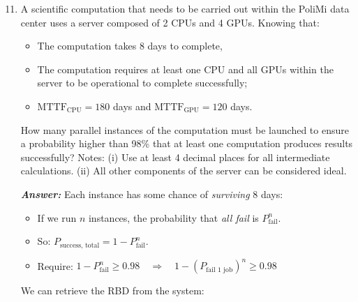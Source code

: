 \begin{enumerate}
    \setcounter{enumi}{10}

    \item A scientific computation that needs to be carried out within the PoliMi data center uses a server composed of 2 CPUs and 4 GPUs. Knowing that:
    \begin{itemize}
        \item The computation takes 8 days to complete,
        \item The computation requires at least one CPU and all GPUs within the server to be operational to complete successfully;
        \item $\text{MTTF}_{\text{CPU}} = 180$ days and $\text{MTTF}_\text{GPU} = 120$ days.
    \end{itemize}
    How many parallel instances of the computation must be launched to ensure a probability higher than 98\% that at least one computation produces results successfully? Notes: (i) Use at least 4 decimal places for all intermediate calculations. (ii) All other components of the server can be considered ideal.

    \emph{\textcolor{Green3}{\textbf{Answer:}}} Each instance has some chance of \emph{surviving} 8 days:
    \begin{itemize}
        \item If we run $n$ instances, the probability that \emph{all fail} is $P_{\text{fail}}^n$.
        \item So: $P_{\text{success, total}} = 1 - P_{\text{fail}}^n$.
        \item Require: $1 - P_{\text{fail}}^n \ge 0.98 \quad \Rightarrow \quad 1 - \left(P_{\text{fail 1 job}}\right)^{n} \ge 0.98$
    \end{itemize}
    We can retrieve the RBD from the system:
    \begin{center}
\end{center}
\end{enumerate}
